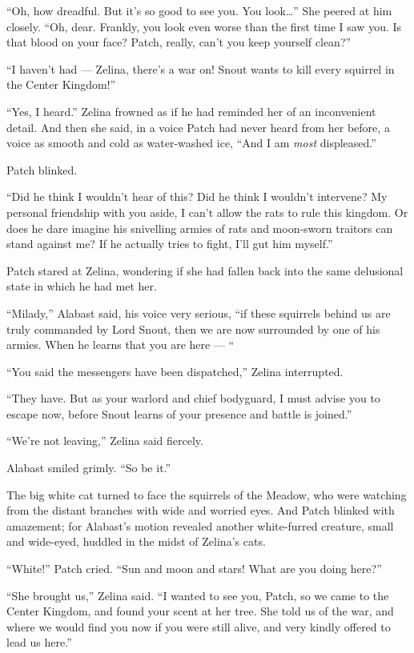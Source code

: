 \documentclass[ebook,oneside,openany,17pt]{memoir}
\begin{document}
“Oh, how dreadful. But it’s so good to see you. You look…” She peered
at him closely. “Oh, dear. Frankly, you look even worse than the first
time I saw you. Is that blood on your face? Patch, really, can’t you
keep yourself clean?”

“I haven’t had — Zelina, there’s a war on! Snout wants to kill every
squirrel in the Center Kingdom!”

“Yes, I heard.” Zelina frowned as if he had reminded her of an
inconvenient detail. And then she said, in a voice Patch had never
heard from her before, a voice as smooth and cold as water-washed ice,
“And I am \emph{most} displeased.”

Patch blinked.

“Did he think I wouldn’t hear of this? Did he think I wouldn’t
intervene? My personal friendship with you aside, I can’t allow the
rats to rule this kingdom. Or does he dare imagine his snivelling
armies of rats and moon-sworn traitors can stand against me? If he
actually tries to fight, I’ll gut him myself.”

Patch stared at Zelina, wondering if she had fallen back into the same
delusional state in which he had met her.

“Milady,” Alabast said, his voice very serious, “if these squirrels
behind us are truly commanded by Lord Snout, then we are now
surrounded by one of his armies. When he learns that you are here — “

“You said the messengers have been dispatched,” Zelina interrupted.

“They have. But as your warlord and chief bodyguard, I must advise you
to escape now, before Snout learns of your presence and battle is
joined.”

“We’re not leaving,” Zelina said fiercely.

Alabast smiled grimly. “So be it.”

The big white cat turned to face the squirrels of the Meadow, who were
watching from the distant branches with wide and worried eyes. And
Patch blinked with amazement; for Alabast’s motion revealed another
white-furred creature, small and wide-eyed, huddled in the midst of
Zelina’s cats.

“White!” Patch cried. “Sun and moon and stars! What are you doing
here?”

“She brought us,” Zelina said. “I wanted to see you, Patch, so we came
to the Center Kingdom, and found your scent at her tree. She told us
of the war, and where we would find you now if you were still alive,
and very kindly offered to lead us here.”
\end{document}
